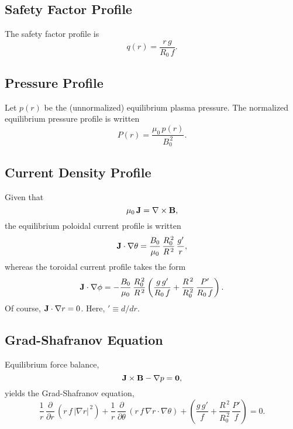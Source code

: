 \documentclass[12pt,prb,aps,notitlepage]{revtex4-1}
\begin{document}
\subsection{Safety Factor Profile}
The safety factor profile is
\begin{equation}\label{e6}
q(r) = \frac{r\,g}{R_0\,f}.
\end{equation}

\subsection{Pressure Profile}
Let $p(r)$  be the (unnormalized) equilibrium plasma pressure. The normalized equilibrium pressure profile is
written
\begin{equation}
P(r) = \frac{\mu_0\,p(r)}{B_0^{\,2}}.
\end{equation}

\subsection{Current Density Profile}
Given that
\begin{equation}
\mu_0\,{\bf J} = \nabla\times {\bf B},
\end{equation}
the equilibrium poloidal current profile is written
\begin{equation}
{\bf J}\cdot\nabla\theta = \frac{B_0}{\mu_0}\,\frac{R_0^{\,2}}{R^{\,2}}\,\frac{g'}{r},
\end{equation}
whereas the toroidal current profile takes the form
\begin{equation}\label{e11}
{\bf J}\cdot\nabla \phi= -\frac{B_0}{\mu_0}\,\frac{R_0^{\,2}}{R^{\,2}}\left(\frac{g\,g'}{R_0\,f} +
\frac{R^{\,2}}{R_0^{\,2}}\,\frac{P'}{R_0\,f}\right).
\end{equation}
Of course, ${\bf J}\cdot\nabla r = 0$. Here, $'\equiv d/dr$. 

\subsection{Grad-Shafranov Equation}
Equilibrium force balance,
\begin{equation}
{\bf J}\times{\bf B} - \nabla p = {\bf 0},
\end{equation}
yields
the Grad-Shafranov equation, 
\begin{equation}\label{e8}
\frac{1}{r}\,\frac{\partial}{\partial r}\,(r\,f\,|\nabla r|^{\,2}) + \frac{1}{r}\,\frac{\partial}{\partial\theta}\,(r\,f\,\nabla r\cdot\nabla \theta) + \left(\frac{g\,g'}{f} + \frac{R^{\,2}}{R_0^{\,2}}\,\frac{P'}{f}\right) = 0.
\end{equation}
\end{document}
